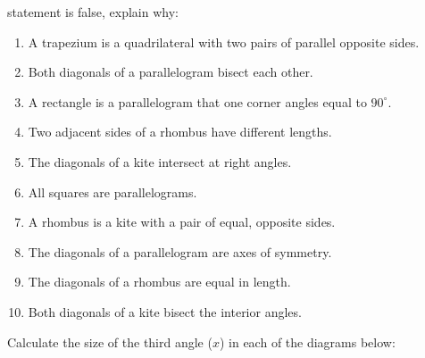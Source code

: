 statement is false, explain why:
\begin{enumerate}[noitemsep, label=\textbf{\arabic*}. ] 
\item  A trapezium is a quadrilateral with two pairs of parallel opposite sides.
\item  Both diagonals of a parallelogram bisect each other.
\item  A rectangle is a parallelogram that one corner angles equal to $90^{\circ}$.
\item  Two adjacent sides of a rhombus have different lengths.
\item  The diagonals of a kite intersect at right angles.
\item All squares are parallelograms.
\item A rhombus is a kite with a pair of equal, opposite sides.
\item The diagonals of a parallelogram are axes of symmetry.
\item The diagonals of a rhombus are equal in length.
\item Both diagonals of a kite bisect the interior angles.
\end{enumerate}
Calculate the size of the third angle ($x$) in each of the diagrams below:\\
